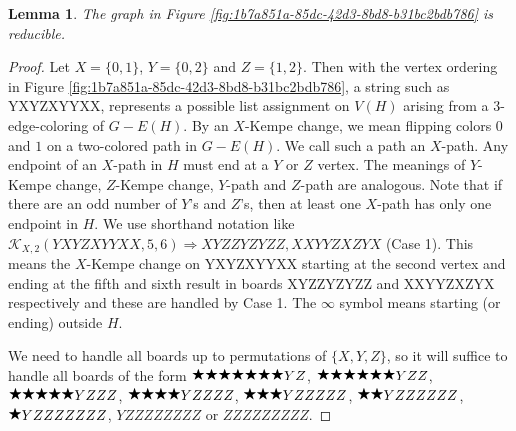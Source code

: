 \documentclass[12pt]{article}
\theoremstyle{plain}
\newtheorem{lem}[thm]{Lemma}
\theoremstyle{definition}
\theoremstyle{remark}
\newcommand{\fancy}[1]{\mathcal{#1}}
\def\K{\fancy{K}}
\newcommand{\wild}{\raisebox{0.75\depth}{$\bigstar$}}
\begin{document}
\begin{lem}
	The graph in Figure \ref{fig:1b7a851a-85dc-42d3-8bd8-b31bc2bdb786} is reducible.
\end{lem}
\begin{proof}Let $X = \{0,1\}$, $Y = \{0,2\}$ and $Z = \{1,2\}$. Then with the vertex ordering in Figure \ref{fig:1b7a851a-85dc-42d3-8bd8-b31bc2bdb786}, a string such as YXYZXYYXX, 
	represents a possible list assignment on $V(H)$ arising from a $3$-edge-coloring of $G-E(H)$.
	By an $X$-Kempe change, we mean flipping colors $0$ and $1$ on a two-colored path in $G-E(H)$.  We call such a path an $X$-path. 
	Any endpoint of an $X$-path in $H$ must end at a $Y$ or $Z$ vertex.  The meanings of $Y$-Kempe change, $Z$-Kempe change, $Y$-path and $Z$-path are analogous.
	Note that if there are an odd number of $Y$'s and $Z$'s, then at least one $X$-path has only one endpoint in $H$.
	We use shorthand notation like $\K_{X, 2}(YXYZXYYXX,5,6) \Rightarrow XYZZYZYZZ,XXYYZXZYX$ (Case 1).
	This means the $X$-Kempe change on YXYZXYYXX starting at the second vertex and ending at the fifth and sixth result in boards XYZZYZYZZ and XXYYZXZYX respectively and these are handled by Case 1.
	The $\infty$ symbol means starting (or ending) outside $H$.
	
	We need to handle all boards up to permutations of $\{X,Y,Z\}$, so it will suffice to handle all boards of the form $\wild \wild \wild \wild \wild \wild \wild YZ$, $\wild \wild \wild \wild \wild \wild YZZ$, $\wild \wild \wild \wild \wild YZZZ$, $\wild \wild \wild \wild YZZZZ$, $\wild \wild \wild YZZZZZ$, $\wild \wild YZZZZZZ$, $\wild YZZZZZZZ$, $YZZZZZZZZ$ or $ZZZZZZZZZ$.
	

\end{proof}
\end{document}
